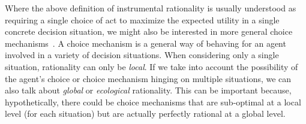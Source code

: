 \documentclass[a4paper]{article}
\begin{document}
Where the above definition of instrumental rationality is usually understood as requiring a single choice of act to maximize the expected utility in a single concrete decision situation, we might also be interested in more general choice mechanisms~\parencite[\emph{e.g.}]{ZollmanSmead2010:Plasticity-and-,HagenChater2012:Decision-Making,FawcettHamblin2013:Exposing-the-be,GaleazziFranke2016:Smart-Transform}.
A choice mechanism is a general way of behaving for an agent involved in a variety of decision situations.
When considering only a single situation, rationality can only be \emph{local}.
If we take into account the possibility of the agent's choice or choice mechanism hinging on multiple situations, we can also talk about \emph{global} or \emph{ecological} rationality.
This can be important because, hypothetically, there could be choice mechanisms that are sub-optimal at a local level (for each situation) but are actually perfectly rational at a global level.

\end{document}
